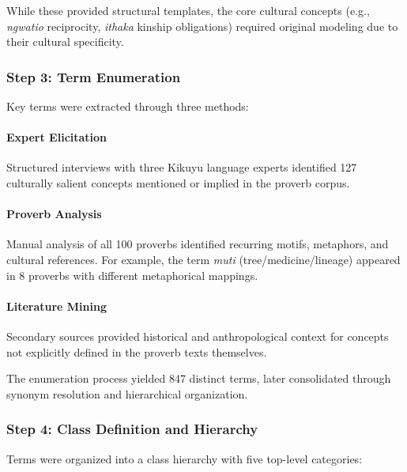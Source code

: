 While these provided structural templates, the core cultural concepts (e.g., \emph{ngwatio} reciprocity, \emph{ithaka} kinship obligations) required original modeling due to their cultural specificity.

\subsubsection{Step 3: Term Enumeration}
\label{subsubsec:term_enumeration}

Key terms were extracted through three methods:

\paragraph{Expert Elicitation} Structured interviews with three Kikuyu language experts identified 127 culturally salient concepts mentioned or implied in the proverb corpus.

\paragraph{Proverb Analysis} Manual analysis of all 100 proverbs identified recurring motifs, metaphors, and cultural references. For example, the term \emph{muti} (tree/medicine/lineage) appeared in 8 proverbs with different metaphorical mappings.

\paragraph{Literature Mining} Secondary sources \cite{kenyatta1938facing,leakey1977southern,muriuki1974history} provided historical and anthropological context for concepts not explicitly defined in the proverb texts themselves.

The enumeration process yielded 847 distinct terms, later consolidated through synonym resolution and hierarchical organization.

\subsubsection{Step 4: Class Definition and Hierarchy}
\label{subsubsec:class_definition}

Terms were organized into a class hierarchy with five top-level categories:

